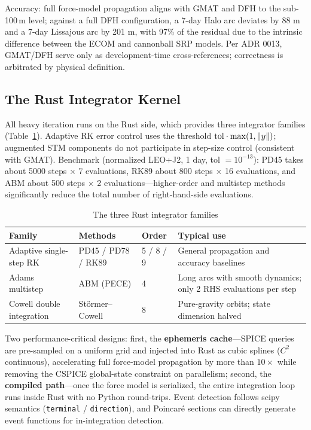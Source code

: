 Accuracy: full force-model propagation aligns with GMAT and DFH to the
sub-100\,m level; against a full DFH configuration, a 7-day Halo arc deviates
by 88 m and a 7-day Lissajous arc by 201 m, with 97\% of the residual due to
the intrinsic difference between the ECOM and cannonball SRP models. Per
ADR 0013, GMAT/DFH serve only as development-time cross-references;
correctness is arbitrated by physical definition.

\subsection{The Rust Integrator Kernel}

All heavy iteration runs on the Rust side, which provides three integrator
families (Table~\ref{tab:integrators}). Adaptive RK error control uses the
threshold $\mathrm{tol}\cdot\max(1, \left\lVert y \right\rVert)$; augmented STM components do
not participate in step-size control (consistent with GMAT). Benchmark
(normalized LEO+J2, 1 day, tol $=10^{-13}$): PD45 takes about 5000 steps
$\times$ 7 evaluations, RK89 about 800 steps $\times$ 16 evaluations, and ABM
about 500 steps $\times$ 2 evaluations---higher-order and multistep methods
significantly reduce the total number of right-hand-side evaluations.

\begin{table}[htbp]
\centering\small
\caption{The three Rust integrator families}
\label{tab:integrators}
\begin{tabularx}{\textwidth}{@{}lllX@{}}
\toprule
\textbf{Family} & \textbf{Methods} & \textbf{Order} & \textbf{Typical use} \\
\midrule
Adaptive single-step RK & PD45 / PD78 / RK89 & 5 / 8 / 9 & General
propagation and accuracy baselines \\
Adams multistep & ABM (PECE) & 4 & Long arcs with smooth dynamics; only 2
RHS evaluations per step \\
Cowell double integration & Störmer--Cowell & 8 & Pure-gravity orbits; state
dimension halved \\
\bottomrule
\end{tabularx}
\end{table}

Two performance-critical designs: first, the \textbf{ephemeris cache}---SPICE
queries are pre-sampled on a uniform grid and injected into Rust as cubic
splines ($C^2$ continuous), accelerating full force-model propagation by more
than $10\times$ while removing the CSPICE global-state constraint on
parallelism; second, the \textbf{compiled path}---once the force model is
serialized, the entire integration loop runs inside Rust with no Python
round-trips. Event detection follows scipy semantics (\texttt{terminal} /
\texttt{direction}), and Poincar\'e sections can directly generate event
functions for in-integration detection.

